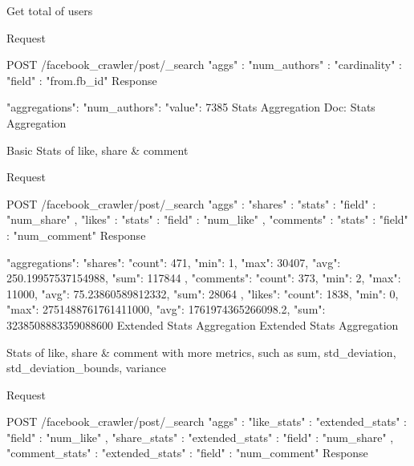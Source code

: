 Get total of users

Request

POST /facebook_crawler/post/_search
{
    "aggs" : {
        "num_authors" : { "cardinality" : { "field" : "from.fb_id" } }
    }
}
Response

{
   "aggregations": {
      "num_authors": {
         "value": 7385
      }
   }
}
Stats Aggregation
Doc: Stats Aggregation

Basic Stats of like, share & comment

Request

POST /facebook_crawler/post/_search
{
    "aggs" : {
        "shares" : { "stats" : { "field" : "num_share" } },
        "likes" : { "stats" : { "field" : "num_like" } },
        "comments" : { "stats" : { "field" : "num_comment" } }
    }
}
Response

{
   "aggregations": {
      "shares": {
         "count": 471,
         "min": 1,
         "max": 30407,
         "avg": 250.19957537154988,
         "sum": 117844
      },
      "comments": {
         "count": 373,
         "min": 2,
         "max": 11000,
         "avg": 75.23860589812332,
         "sum": 28064
      },
      "likes": {
         "count": 1838,
         "min": 0,
         "max": 2751488761761411000,
         "avg": 1761974365266098.2,
         "sum": 3238508883359088600
      }
   }
}
Extended Stats Aggregation
Extended Stats Aggregation

Stats of like, share & comment with more metrics, such as sum, std_deviation, std_deviation_bounds, variance

Request

POST /facebook_crawler/post/_search
{
    "aggs" : {
        "like_stats" : { "extended_stats" : { "field" : "num_like" } },
        "share_stats" : { "extended_stats" : { "field" : "num_share" } },
        "comment_stats" : { "extended_stats" : { "field" : "num_comment" } }
    }
}
Response

